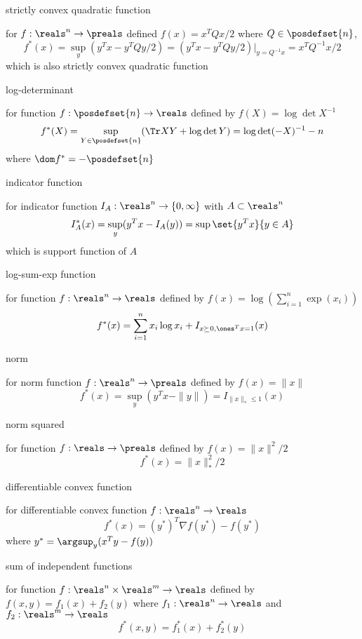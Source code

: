 \documentclass[17pt,landscape]{foils}
\begin{document}
{

\bit
\item
	strictly convex quadratic function
	\bit
	\item
		for $f:\reals^n \to \preals$
		defined $f(x) = x^TQx/2$ where $Q\in \posdefset{n}$,
		$$
			f^\ast(x)= \sup_y(y^Tx - y^TQy/2)
			 = (y^Tx - y^TQy/2)|_{y=Q^{-1}x}
			 = x^TQ^{-1}x/2
		$$
		which is also strictly convex quadratic function
	\eit

\item
	log-determinant
	\bit
	\item
		for
		function $f:\posdefset{n} \to \reals$
		defined by $f(X) = \log \det X^{-1}$
		$$
			f^\ast(X)
			=
			\sup_{Y\in\posdefset{n}} (\Tr XY + \log \det Y)
			= \log\det (-X)^{-1} - n
		$$
		where $\dom f^\ast = -\posdefset{n}$
	\eit

\item
	indicator function
	\bit
	\item
		for
		indicator function $I_A:\reals^n\to\{0,\infty\}$ with $A\subset \reals^n$
		$$
			I_A^\ast(x) = \sup_y (y^Tx - I_A(y)) = \sup \set{y^Tx}{y\in A}
		$$
		which is support function of $A$
	\eit

\item
	log-sum-exp function
	\bit
	\item
		for
		function $f: \reals^n \to \reals$
		defined by $f(x) = \log(\sum_{i=1}^n \exp(x_i))$
		$$
			f^\ast(x) =
			\sum_{i=1}^n x_i \log x_i + I_{x\succeq 0, \ones^T x = 1}(x)
		$$
	\eit

\item
	norm
	\bit
	\item
		for norm function $f:\reals^n\to\preals$ defined by $f(x)=\|x\|$
		$$
			f^\ast(x)
			=
			\sup_y( {y^Tx - \|y\|})
			= I_{\|x\|_\ast\leq1}(x)
		$$
	\eit

\item
	norm squared
	\bit
	\item
		for
		function $f: \reals \to \preals$
		defined by $f(x) = \|x\|^2/2$
		$$
			f^\ast(x) = \|x\|_\ast^2/2
		$$
	\eit

\item
	differentiable convex function
	\bit
	\item
		for
		differentiable convex function $f:\reals^n\to\reals$
		$$
			f^\ast(x)=
			(y^\ast)^T \nabla f(y^\ast) - f(y^\ast)
		$$
		where $y^\ast = \argsup_y (x^Ty-f(y))$
	\eit

\item
	sum of independent functions
	\bit
	\item
		for
		function $f:\reals^n\times \reals^m \to \reals$ defined by $f(x,y) = f_1(x) + f_2(y)$
		where $f_1:\reals^n\to\reals$ and $f_2:\reals^m\to\reals$
		$$
			f^\ast(x,y) = f_1^\ast(x) + f_2^\ast(y)
		$$
	\eit
\eit


}
\end{document}
